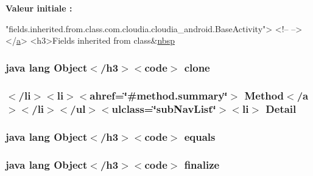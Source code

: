 {\bfseries Valeur initiale \-:}
\begin{DoxyCode}
\textcolor{stringliteral}{"fields.inherited.from.class.com.cloudia.cloudia\_android.BaseActivity"}>
<!--   -->
</\hyperlink{stylesheet_8css_a5e8981582017bb8b84c21f148345d1f7}{a}>
<h3>Fields inherited from \textcolor{keyword}{class}&\hyperlink{allclasses-frame_8html_aef915316f784c9063d942974538301a6}{nbsp}
\end{DoxyCode}
\hypertarget{_show_all_activity_8html_adc9607fcabf6f2d7f401ad52015ef6e0}{
\subsubsection[{clone}]{\setlength{\rightskip}{0pt plus 5cm}java lang Object$<$/h3$>$$<$code$>$ clone}}\label{_show_all_activity_8html_adc9607fcabf6f2d7f401ad52015ef6e0}
\hypertarget{_show_all_activity_8html_a1e04b5ec07bcd5281e26dcd40e5b3a94}{
\subsubsection[{Detail}]{\setlength{\rightskip}{0pt plus 5cm}$<$/li$>$$<$li$>$$<$ahref=\char`\"{}\#method.\-summary\char`\"{}$>$ Method$<$/{\bf a}$>$$<$/li$>$$<$/ul$>$$<$ulclass=\char`\"{}sub\-Nav\-List\char`\"{}$>$$<$li$>$ Detail}}\label{_show_all_activity_8html_a1e04b5ec07bcd5281e26dcd40e5b3a94}
\hypertarget{_show_all_activity_8html_a8974318cea585f72df717e0380ec7104}{
\subsubsection[{equals}]{\setlength{\rightskip}{0pt plus 5cm}java lang Object$<$/h3$>$$<$code$>$ equals}}\label{_show_all_activity_8html_a8974318cea585f72df717e0380ec7104}
\hypertarget{_show_all_activity_8html_ab2315181ead4aeedef2374039b6ddde7}{
\subsubsection[{finalize}]{\setlength{\rightskip}{0pt plus 5cm}java lang Object$<$/h3$>$$<$code$>$ finalize}}\label{_show_all_activity_8html_ab2315181ead4aeedef2374039b6ddde7}
